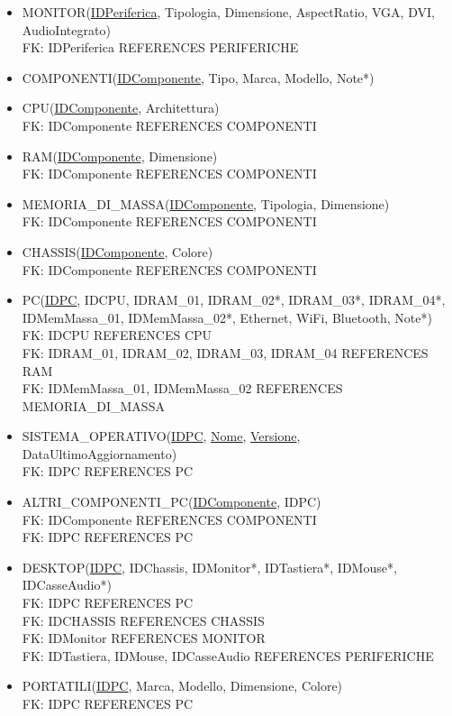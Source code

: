 \documentclass[a4paper,12pt]{report}
\begin{document}
\begin{itemize}
	\item MONITOR(\underline{IDPeriferica}, Tipologia, Dimensione, AspectRatio, VGA, DVI, AudioIntegrato)
		\\ FK: IDPeriferica REFERENCES PERIFERICHE
	\item COMPONENTI(\underline{IDComponente}, Tipo, Marca, Modello, Note*)
	\item CPU(\underline{IDComponente}, Architettura)
		\\ FK: IDComponente REFERENCES COMPONENTI
	\item RAM(\underline{IDComponente}, Dimensione)
		\\ FK: IDComponente REFERENCES COMPONENTI
	\item MEMORIA\_DI\_MASSA(\underline{IDComponente}, Tipologia, Dimensione)
		\\ FK: IDComponente REFERENCES COMPONENTI
	\item CHASSIS(\underline{IDComponente}, Colore)
		\\ FK: IDComponente REFERENCES COMPONENTI
	\item PC(\underline{IDPC}, IDCPU, IDRAM\_01, IDRAM\_02*, IDRAM\_03*, IDRAM\_04*, IDMemMassa\_01, IDMemMassa\_02*, Ethernet, WiFi, Bluetooth, Note*)
		\\ FK: IDCPU REFERENCES CPU
		\\ FK: IDRAM\_01, IDRAM\_02, IDRAM\_03, IDRAM\_04 REFERENCES RAM
		\\ FK: IDMemMassa\_01, IDMemMassa\_02 REFERENCES MEMORIA\_DI\_MASSA
	\item SISTEMA\_OPERATIVO(\underline{IDPC}, \underline{Nome}, \underline{Versione}, DataUltimoAggiornamento)
		\\ FK: IDPC REFERENCES PC
	\item ALTRI\_COMPONENTI\_PC(\underline{IDComponente}, IDPC)
		\\ FK: IDComponente REFERENCES COMPONENTI
		\\ FK: IDPC REFERENCES PC
	\item DESKTOP(\underline{IDPC}, IDChassis, IDMonitor*, IDTastiera*, IDMouse*, IDCasseAudio*)
		\\ FK: IDPC REFERENCES PC
		\\ FK: IDCHASSIS REFERENCES CHASSIS
		\\ FK: IDMonitor REFERENCES MONITOR
		\\ FK: IDTastiera, IDMouse, IDCasseAudio REFERENCES PERIFERICHE
	\item PORTATILI(\underline{IDPC}, Marca, Modello, Dimensione, Colore)
		\\ FK: IDPC REFERENCES PC
\end{itemize}
\end{document}
